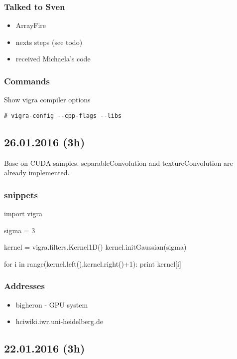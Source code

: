 \documentclass[12pt,a4paper]{article}
\begin{document}
  \subsubsection{Talked to Sven}
    \begin{itemize}
      \item ArrayFire
      \item nexts steps (see todo)
      \item received Michaela's code
    \end{itemize}

  \subsubsection{Commands}

    Show vigra compiler options
    \begin{lstlisting}[style=BashInputStyle]
# vigra-config --cpp-flags --libs 
    \end{lstlisting}

\subsection{26.01.2016 (3h)}

  Base on CUDA samples. separableConvolution and textureConvolution are already implemented.

  \subsubsection{snippets}
    \begin{python}[caption="print out gaussian 1D kernel"]
import vigra

sigma = 3

kernel = vigra.filters.Kernel1D()
kernel.initGaussian(sigma)

for i in range(kernel.left(),kernel.right()+1):
  print kernel[i]
    \end{python}

  \subsubsection{Addresses}
    \begin{itemize}
      \item bigheron - GPU system
      \item hciwiki.iwr.uni-heidelberg.de
    \end{itemize}


\subsection{22.01.2016 (3h)}
\end{document}
